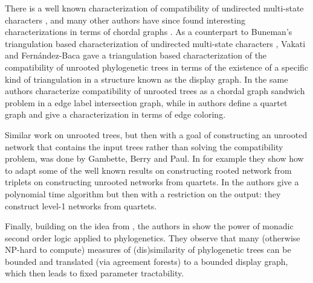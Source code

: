There is a well known characterization of compatibility of undirected multi-state characters \cite{Buneman1974205}, and many other authors have since found interesting characterizations in terms of chordal graphs \cite{gysel2012reducing, meacham1983, Semple2002169}. As a counterpart to Buneman's triangulation based characterization of undirected multi-state characters \cite{Buneman1974205}, Vakati and Fern\'andez-Baca \cite{vakati2011graph} gave a triangulation based characterization of the compatibility of unrooted phylogenetic trees in terms of the existence of a specific kind of triangulation in a structure known as the display graph. In \cite{VakBac13} the same authors characterize compatibility of unrooted trees as a chordal graph sandwich problem in a edge label intersection graph, while in \cite{GruHum08} authors define a quartet graph and give a characterization in terms of edge coloring.

Similar work on unrooted trees, but then with a goal of constructing an unrooted network that contains the input trees rather than solving the compatibility problem, was done by Gambette, Berry and Paul. In \cite{GBP2012} for example they show how to adapt some of the well known results on constructing rooted network from triplets on constructing unrooted networks from quartets. In \cite{JRudi2014} the authors give a polynomial time algorithm but then with a restriction on the output: they construct level-1 networks from quartets. 

Finally, building on the idea from \cite{BryLag06}, the authors in \cite{KelkIS15} show the power of monadic second order logic applied to phylogenetics. They observe that many (otherwise NP-hard to compute) measures of (dis)similarity of phylogenetic trees can be bounded and translated (via agreement forests) to a bounded display graph, which then leads to fixed parameter tractability. 



